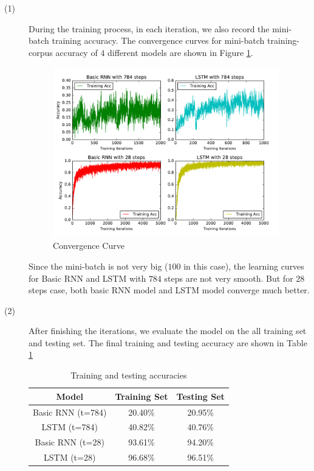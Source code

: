 \begin{description}

\item[(1) ] During the training process, in each iteration, we also record the mini-batch training accuracy. The convergence curves for mini-batch training-corpus accuracy of $4$ different models are shown in Figure \ref{fig:curve}.

\begin{figure}[H]
\centering
\includegraphics[width=0.97\textwidth]{./figures/convergence.pdf}
\caption{\label{fig:curve} Convergence Curve}
\end{figure}

Since the mini-batch is not very big ($100$ in this case), the learning curves for Basic RNN and LSTM with $784$ steps are not very smooth. But for $28$ steps case, both basic RNN model and LSTM model converge much better.

\item[(2) ] After finishing the iterations, we evaluate the model on the all training set and testing set. The final training and testing accuracy are shown in Table \ref{table:accuracy}

\begin{table}[H]
	\centering
	\caption{Training and testing accuracies}
	\label{table:accuracy}	
	\begin{tabular}{c | c | c }
		\hline \hline
		Model 				&	Training Set	&  Testing Set \\[0.1cm]
		\hline
		Basic RNN (t=784) 	&	20.40\%			&  20.95\%     \\[0.1cm]
		LSTM (t=784)		&	40.82\%			&  40.76\%     \\[0.1cm]   
		Basic RNN (t=28)	&	93.61\%			&  94.20\%     \\[0.1cm]
		LSTM (t=28)			&	96.68\%			&  96.51\%     \\[0.1cm]
		\hline	
	\end{tabular}
\end{table}

\end{description}


\clearpage

%
%
%



